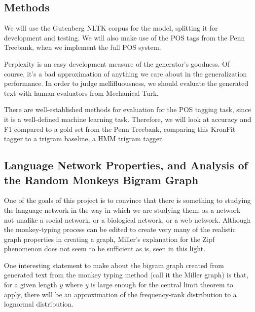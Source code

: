 \documentclass[12pt]{article}
\begin{document}
\subsection{Methods}
We will use the Gutenberg NLTK corpus for the model, splitting it for development and testing. We will also make use of the POS tags from the Penn Treebank, when we implement the full POS system. \cite{nltk}

Perplexity is an easy development measure of the generator's goodness. Of course, it's a bad approximation of anything we care about in the generalization performance. In order to judge mellifluousness, we should evaluate the generated text with human evaluators from Mechanical Turk.

There are well-established methods for evaluation for the POS tagging task, since it is a well-defined machine learning task. Therefore, we will look at accuracy and F1 compared to a gold set from the Penn Treebank, comparing this KronFit tagger to a trigram baseline, a HMM trigram tagger.


\subsection{Language Network Properties, and Analysis of the Random Monkeys Bigram Graph}

One of the goals of this project is to convince that there is something to studying the language network in the way in which we are studying them: as a network not unalike a social network, or a biological network, or a web network. Although the monkey-typing process can be edited to create very many of the realistic graph properties in creating a graph, Miller's explanation for the Zipf phenomenon does not seem to be sufficient as is, seen in this light. %

One interesting statement to make about the bigram graph created from generated text from the monkey typing method (call it the Miller graph) is that, for a given length $y$ where $y$ is large enough for the central limit theorem to apply, there will be an approximation of the frequency-rank distribution to a lognormal distribution.
\end{document}
